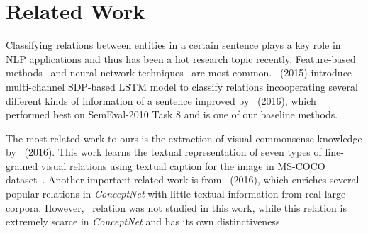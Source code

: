 \section{Related Work}
Classifying relations between entities in a certain sentence plays a key role in NLP applications and thus has been a hot research topic recently.
Feature-based methods~\cite{sem} and neural network techniques~\cite{socher2011semi, ebrahimi2015chain} are most common. 
\citeauthor{xu2015classifying}~(2015) introduce multi-channel SDP-based LSTM model to classify relations incooperating several different kinds of information of a sentence improved by \citeauthor{xu2016improved}~(2016), which performed best on SemEval-2010 Task 8 and is one of our baseline methods. 

The most related work to ours is the extraction of
visual commonsense knowledge by \citeauthor{yatskar2016stating}~(2016). 
This work learns the textual representation of seven types of fine-grained 
visual relations using textual caption for the image in MS-COCO dataset~\cite{lin2014microsoft}.
Another important related work is from \citeauthor{li2016commonsense}~(2016), which enriches
several popular relations in \textit{ConceptNet} with little textual information from
real large corpora. However, \lnear~relation was not studied in this work, while this relation is extremely scarce in \textit{ConceptNet} and has its own distinctiveness.
